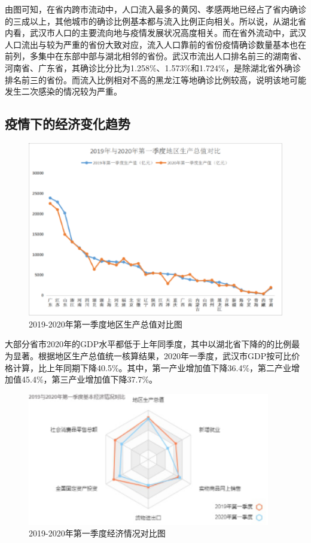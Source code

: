\documentclass[12pt,hyperref,]{ctexart}
\begin{document}
由图可知，在省内跨市流动中，人口流入最多的黄冈、孝感两地已经占了省内确诊的三成以上，其他城市的确诊比例基本都与流入比例正向相关。所以说，从湖北省内看，武汉市人口的主要流向地与疫情发展状况高度相关。而在省外流动中，武汉人口流出与较为严重的省份大致对应，流入人口靠前的省份疫情确诊数量基本也在前列，多集中在东部中部与湖北相邻的省份。武汉市流出人口排名前三的湖南省、河南省、广东省，其确诊比分比为1.258\%、1.573\%和1.724\%，是除湖北省外确诊排名前三的省份。而流入比例相对不高的黑龙江等地确诊比例较高，说明该地可能发生二次感染的情况较为严重。

\hypertarget{ux75abux60c5ux4e0bux7684ux7ecfux6d4eux53d8ux5316ux8d8bux52bf}{%
\subsection{疫情下的经济变化趋势}\label{ux75abux60c5ux4e0bux7684ux7ecfux6d4eux53d8ux5316ux8d8bux52bf}}

\begin{figure}
\includegraphics[width=5.56in]{image/3.4.1} \caption{2019-2020年第一季度地区生产总值对比图}\label{fig:3.9}
\end{figure}

大部分省市2020年的GDP水平都低于上年同季度，其中以湖北省下降的的比例最为显著。根据地区生产总值统一核算结果，2020年一季度，武汉市GDP按可比价格计算，比上年同期下降40.5\%。其中，第一产业增加值下降36.4\%，第二产业增加值45.4\%，第三产业增加值下降37.7\%。

\begin{figure}
\includegraphics[width=4.17in]{image/3.4.2} \caption{2019-2020年第一季度经济情况对比图}\label{fig:3.10}
\end{figure}
\end{document}

